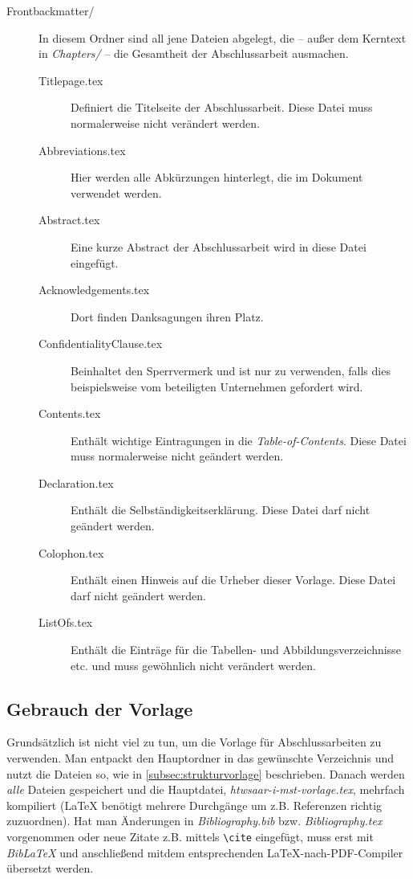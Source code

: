 \begin{description}
 \item [Frontbackmatter/]
 In diesem Ordner sind all jene Dateien abgelegt, die -- außer dem Kerntext in \textit{Chapters/} -- die Gesamtheit der Abschlussarbeit ausmachen.
      \begin{description}
       \item [Titlepage.tex] Definiert die Titelseite der Abschlussarbeit. Diese Datei muss normalerweise nicht verändert werden.
       \item [Abbreviations.tex] Hier werden alle Abkürzungen hinterlegt, die im Dokument verwendet werden.
       \item [Abstract.tex] Eine kurze Abstract der Abschlussarbeit wird in diese Datei eingefügt.
       \item [Acknowledgements.tex] Dort finden Danksagungen ihren Platz.
       \item [ConfidentialityClause.tex] Beinhaltet den Sperrvermerk und ist nur zu verwenden, falls dies beispielsweise vom beteiligten Unternehmen gefordert wird.
       \item [Contents.tex] Enthält wichtige Eintragungen in die \textit{Table-of-Contents}. Diese Datei muss normalerweise nicht geändert werden.
       \item [Declaration.tex] Enthält die Selbständigkeitserklärung. Diese Datei darf nicht geändert werden.
       \item [Colophon.tex] Enthält einen Hinweis auf die Urheber dieser Vorlage. Diese Datei darf nicht geändert werden.
       \item [ListOfs.tex] Enthält die Einträge für die Tabellen- und Abbildungsverzeichnisse etc. und muss gewöhnlich nicht verändert werden.
      \end{description}

\end{description}


\subsection{Gebrauch der Vorlage}

Grundsätzlich ist nicht viel zu tun, um die Vorlage für Abschlussarbeiten zu verwenden. Man entpackt den Hauptordner in das gewünschte Verzeichnis und nutzt die Dateien so, wie in
\autoref{subsec:strukturvorlage} beschrieben. Danach werden \textit{alle} Dateien gespeichert und die Hauptdatei, \textit{htwsaar-i-mst-vorlage.tex}, mehrfach kompiliert
(LaTeX benötigt mehrere Durchgänge um z.B. Referenzen richtig zuzuordnen).
Hat man Änderungen in \textit{Bibliography.bib} bzw. \textit{Bibliography.tex} vorgenommen oder neue Zitate z.B. mittels \lstinline{\cite} eingefügt, muss erst mit 
\textit{BibLaTeX} und anschließend mitdem entsprechenden LaTeX-nach-PDF-Compiler übersetzt werden.


